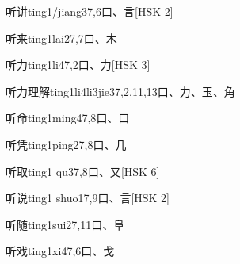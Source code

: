 \begin{EntryWithPhonetic}{听讲}{ting1/jiang3}{7,6}{⼝、⾔}[HSK 2]
\end{EntryWithPhonetic}

\begin{EntryWithPhonetic}{听来}{ting1lai2}{7,7}{⼝、⽊}
\end{EntryWithPhonetic}

\begin{EntryWithPhonetic}{听力}{ting1li4}{7,2}{⼝、⼒}[HSK 3]
\end{EntryWithPhonetic}

\begin{EntryWithPhonetic}{听力理解}{ting1li4li3jie3}{7,2,11,13}{⼝、⼒、⽟、⾓}
\end{EntryWithPhonetic}

\begin{EntryWithPhonetic}{听命}{ting1ming4}{7,8}{⼝、⼝}
\end{EntryWithPhonetic}

\begin{EntryWithPhonetic}{听凭}{ting1ping2}{7,8}{⼝、⼏}
\end{EntryWithPhonetic}

\begin{EntryWithPhonetic}{听取}{ting1 qu3}{7,8}{⼝、⼜}[HSK 6]
\end{EntryWithPhonetic}

\begin{EntryWithPhonetic}{听说}{ting1 shuo1}{7,9}{⼝、⾔}[HSK 2]
\end{EntryWithPhonetic}

\begin{EntryWithPhonetic}{听随}{ting1sui2}{7,11}{⼝、⾩}
\end{EntryWithPhonetic}

\begin{EntryWithPhonetic}{听戏}{ting1xi4}{7,6}{⼝、⼽}
\end{EntryWithPhonetic}

